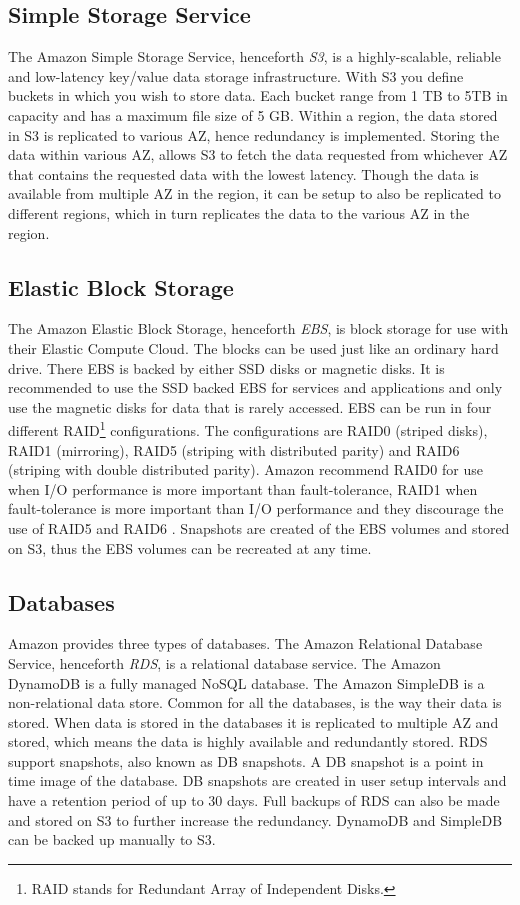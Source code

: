 \documentclass[11pt]{report}
\begin{document}
\subsection{Simple Storage Service}
The Amazon Simple Storage Service, henceforth \emph{S3}, is a highly-scalable, reliable and low-latency key/value data storage infrastructure. With S3 you define buckets in which you wish to store data. Each bucket range from 1 TB to 5TB in capacity and has a maximum file size of 5 GB. Within a region, the data stored in S3 is replicated to various AZ, hence redundancy is implemented. Storing the data within various AZ, allows S3 to fetch the data requested from whichever AZ that contains the requested data with the lowest latency. Though the data is available from multiple AZ in the region, it can be setup to also be replicated to different regions, which in turn replicates the data to the various AZ in the region. 

\subsection{Elastic Block Storage}
The Amazon Elastic Block Storage, henceforth \emph{EBS}, is block storage for use with their Elastic Compute Cloud. The blocks can be used just like an ordinary hard drive. There EBS is backed by either SSD disks or magnetic disks. It is recommended to use the SSD backed EBS for services and applications and only use the magnetic disks for data that is rarely accessed. EBS can be run in four different RAID\footnote{RAID stands for Redundant Array of Independent Disks.} configurations. The configurations are RAID0 (striped disks), RAID1 (mirroring), RAID5 (striping with distributed parity) and RAID6 (striping with double distributed parity). Amazon recommend RAID0 for use when I/O performance is more important than fault-tolerance, RAID1 when fault-tolerance is more important than I/O performance and they discourage the use of RAID5 and RAID6 \cite{AWS_raid_config}. Snapshots are created of the EBS volumes and stored on S3, thus the EBS volumes can be recreated at any time.

\subsection{Databases}
Amazon provides three types of databases. The Amazon Relational Database Service, henceforth \emph{RDS}, is a relational database service. The Amazon DynamoDB is a fully managed NoSQL database. The Amazon SimpleDB is a non-relational data store. Common for all the databases, is the way their data is stored. When data is stored in the databases it is replicated to multiple AZ and stored, which means the data is highly available and redundantly stored. RDS support snapshots, also known as DB snapshots. A DB snapshot is a point in time image of the database. DB snapshots are created in user setup intervals and have a retention period of up to 30 days. Full backups of RDS can also be made and stored on S3 to further increase the redundancy. DynamoDB and SimpleDB can be backed up manually to S3.
\end{document}
